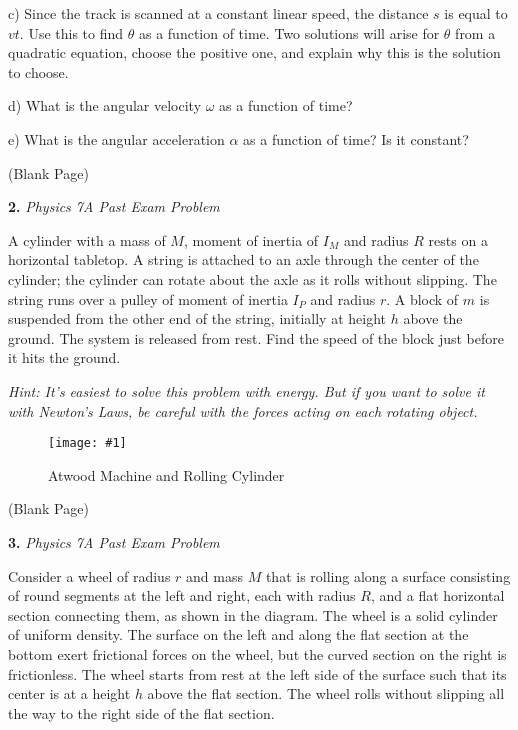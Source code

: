 \documentclass[11pt]{article}
\newcommand{\fig}[4]{
    \begin{figure}[H]
        \centering
        \texttt{[image: \#1]}
        \caption{#2}
        \label{exp4fit}
    \end{figure}
}
\theoremstyle{gangnamstyle}{\newtheorem{definition}{Definition}[]}
\theoremstyle{gangnamstyle}{\newtheorem{example}{Example}[]}
\theoremstyle{gangnamstyle}{\newtheorem{problem}{Problem}[]}
\begin{document}
c) Since the track is scanned at a constant linear speed, the distance $s$ is equal to $vt$. Use this to find $\theta$ as a function of time. Two solutions will arise for $\theta$ from a quadratic equation, choose the positive one, and explain why this is the solution to choose.

d) What is the angular velocity $\omega$ as a function of time?

e) What is the angular acceleration $\alpha$ as a function of time? Is it constant?

\pagebreak

\begin{center}
(Blank Page)
\end{center}

\pagebreak

\textbf{2.} \textit{Physics 7A Past Exam Problem}

A cylinder with a mass of $M$, moment of inertia of $I_M$ and radius $R$ rests on a horizontal tabletop. A string is attached to an axle through the center of the cylinder; the cylinder can rotate about the axle as it rolls without slipping. The string runs over a pulley of moment of inertia $I_P$ and radius $r$. A block of $m$ is suspended from the other end of the string, initially at height $h$ above the ground. The system is released from rest. Find the speed of the block just before it hits the ground. 

\textit{Hint: It's easiest to solve this problem with energy. But if you want to solve it with Newton's Laws, be careful with the forces acting on each rotating object.}

\fig{figs/mt2/past.png}{Atwood Machine and Rolling Cylinder}{0.7}{0}

\pagebreak

\begin{center}
(Blank Page)
\end{center}

\pagebreak

\textbf{3.} \textit{Physics 7A Past Exam Problem}

Consider a wheel of radius $r$ and mass $M$ that is rolling along a surface consisting of round segments at the left and right, each with radius $R$, and a flat horizontal section connecting them, as shown in the diagram. The wheel is a solid cylinder of uniform density. The surface on the left and along the flat section at the bottom exert frictional forces on the wheel, but the curved section on the right is frictionless. The wheel starts from rest at the left side of the surface such that its center is at a height $h$ above the flat section. The wheel rolls without slipping all the way to the right side of the flat section. 
\end{document}
